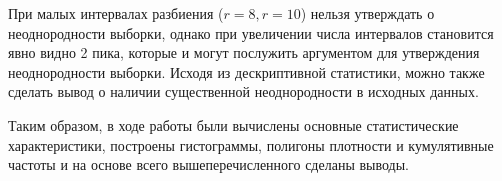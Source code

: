 \begin{itemize}
\begin{figure}[H]
\begin{minipage}[H]{0.44\linewidth}
		\end{minipage}
		\hfill
		\begin{minipage}[H]{0.44\linewidth}
		\end{minipage}
	\end{figure}
	
\end{itemize}

При малых интервалах разбиения ($r = 8, r = 10 $) нельзя утверждать о неоднородности выборки, однако при увеличении числа интервалов становится явно видно 2 пика, которые и могут послужить аргументом для утверждения неоднородности выборки. Исходя из дескриптивной статистики, можно также сделать вывод о наличии существенной неоднородности в исходных данных.

Таким образом, в ходе работы были вычислены основные статистические характеристики, построены гистограммы, полигоны плотности и кумулятивные частоты и на основе всего вышеперечисленного сделаны выводы.
